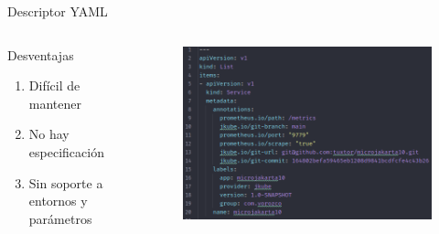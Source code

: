 \documentclass[aspectratio=169]{beamer}
\begin{document}
\begin{frame}{Descriptor YAML}
	\begin{columns}[T] %
		
		\begin{column}[T]{4cm} %
			Desventajas
			\begin{enumerate}
				\item Difícil de mantener
				\item No hay especificación
				\item Sin soporte a entornos y parámetros
			\end{enumerate}
		\end{column}
		\begin{column}[T]{7cm} %
			\begin{figure}
				\centering
				\includegraphics[width=\linewidth]{Images/yaml}
			\end{figure}
			
		\end{column}
	\end{columns}
\end{frame}
\end{document}
